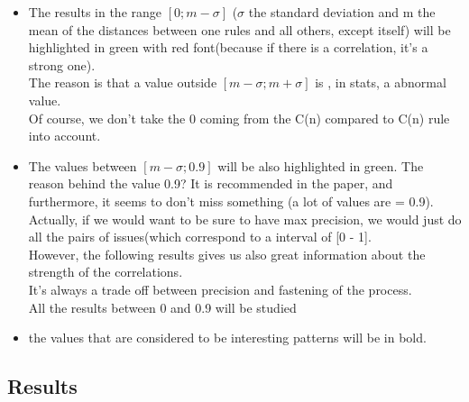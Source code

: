\documentclass{article}
\begin{document}
\begin{itemize}

\item The results in the range $[0 ; m-\sigma]$ ($\sigma$ the standard deviation and m the mean of the distances between one rules and all others, except itself) will be highlighted in green with red font(because if there is a correlation, it's a strong one). \\
The reason is that a value outside $[m-\sigma ; m+\sigma]$ is , in stats, a abnormal value. \\ Of course, we don't take the 0 coming from the C(n) compared to C(n) rule into account. \\ 

\item The values between $[m-\sigma;0.9]$ will be also highlighted in green. The reason behind the value 0.9? It is recommended in the paper, and furthermore, it seems to don't miss something (a lot of values are = 0.9). Actually, if we would want to be sure to have max precision, we would just do all the pairs of issues(which correspond to a interval of [0 - 1]. \\ However, the following results gives us also great information about the strength of the correlations. \\
It's always a trade off between precision and fastening of the process. \\

All the results between 0 and 0.9 will be studied \\

\item the values that are considered to be interesting patterns will be in bold.

\end{itemize}

\subsection{Results} 
\end{document}
